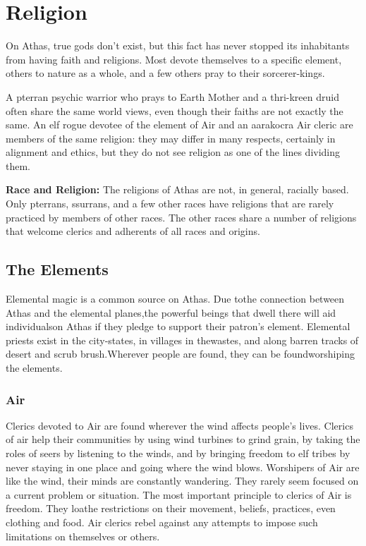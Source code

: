 \section{Religion}
On Athas, true gods don't exist, but this fact has never stopped its inhabitants from having faith and religions. Most devote themselves to a specific element, others to nature as a whole, and a few others pray to their sorcerer-kings.

A pterran psychic warrior who prays to Earth Mother and a thri-kreen druid often share the same world views, even though their faiths are not exactly the same. An elf rogue devotee of the element of Air and an aarakocra Air cleric are members of the same religion: they may differ in many respects, certainly in alignment and ethics, but they do not see religion as one of the lines dividing them.

\textbf{Race and Religion:} The religions of Athas are not, in general, racially based. Only pterrans, ssurrans, and a few other races have religions that are rarely practiced by members of other races. The other races share a number of religions that welcome clerics and adherents of all races and origins.

\subsection{The Elements}
Elemental magic is a common source on Athas. Due tothe connection between Athas and the elemental planes,the powerful beings that dwell there will aid individualson Athas if they pledge to support their patron's element. Elemental priests exist in the city-states, in villages in thewastes, and along barren tracks of desert and scrub brush.Wherever people are found, they can be foundworshiping the elements.

\subsubsection{Air}
Clerics devoted to Air are found wherever the wind affects people's lives. Clerics of air help their communities by using wind turbines to grind grain, by taking the roles of seers by listening to the winds, and by bringing freedom to elf tribes by never staying in one place and going where the wind blows. Worshipers of Air are like the wind, their minds are constantly wandering. They rarely seem focused on a current problem or situation. The most important principle to clerics of Air is freedom. They loathe restrictions on their movement, beliefs, practices, even clothing and food. Air clerics rebel against any attempts to impose such limitations on themselves or others.

